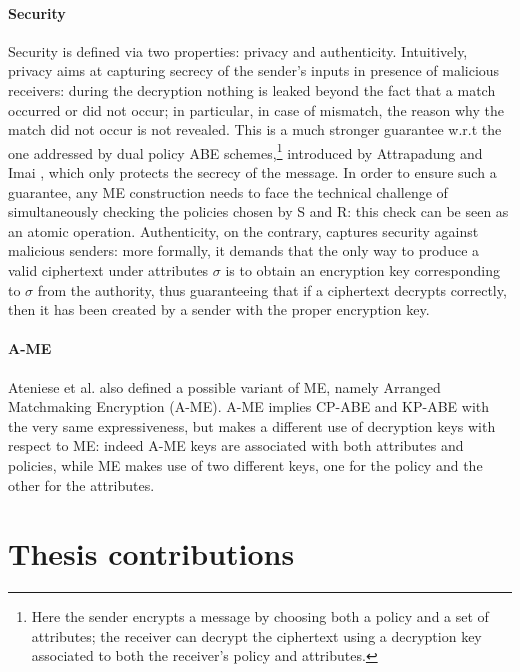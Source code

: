 \paragraph{Security}
Security is defined via two properties: privacy and authenticity.
Intuitively, privacy aims at capturing secrecy of the sender’s inputs in presence of malicious receivers: during the decryption nothing is leaked beyond the fact that a match occurred or did not occur; in particular, in case of mismatch, the reason why the match did not occur is not revealed. This is a much stronger guarantee w.r.t the one addressed by dual policy ABE schemes,\footnote{Here the sender encrypts a message by choosing both a policy and a set of attributes; the receiver can decrypt the ciphertext using a decryption key associated to both the receiver’s policy and attributes.} introduced by Attrapadung and Imai \cite{Attrapadung}, which only protects the secrecy of the message.
In order to ensure such a guarantee, any ME construction needs to face the technical challenge of simultaneously checking the policies chosen by S and R: this check can be seen as an atomic operation.
\newline
Authenticity, on the contrary, captures security against malicious senders: more formally, it demands that the only way to produce a valid ciphertext under attributes $\sigma$ is to obtain an encryption key corresponding to $\sigma$ from the authority, thus guaranteeing that if a ciphertext decrypts correctly, then it has been created by a sender with the proper encryption key.

\paragraph{A-ME}
Ateniese et al. also defined a possible variant of ME, namely Arranged Matchmaking Encryption (A-ME). A-ME implies CP-ABE and KP-ABE with the very same expressiveness, but makes a different use of decryption keys with respect to ME: indeed A-ME keys are associated with both attributes and policies, while ME makes use of two different keys, one for the policy and the other for the attributes.

\section{Thesis contributions}
